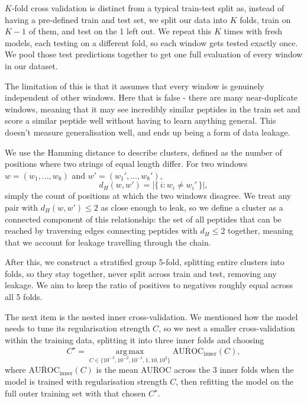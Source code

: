 \documentclass[10pt,a4paper]{article}
\numberwithin{equation}{section}
\begin{document}
$K$-fold cross validation is distinct from a typical train-test split as, instead of having a pre-defined train and test set, we split our data into $K$ folds, train on $K-1$ of them, and test on the 1 left out. We repeat this $K$ times with fresh models, each testing on a different fold, so each window gets tested exactly once. We pool those test predictions together to get one full evaluation of every window in our dataset.

The limitation of this is that it assumes that every window is genuinely independent of other windows. Here that is false - there are many near-duplicate windows, meaning that it may see incredibly similar peptides in the train set and score a similar peptide well without having to learn anything general. This doesn't measure generalisation well, and ends up being a form of data leakage.

We use the Hamming distance to describe clusters, defined as the number of positions where two strings of equal length differ. For two windows $w=(w_1,\dots,w_8)$ and $w'=(w_1',\dots,w_8')$,
\begin{equation}
d_H(w,w') = \bigl|\{\, i : w_i \neq w_i' \,\}\bigr|,
\label{eq:hamming}
\end{equation}
simply the count of positions at which the two windows disagree. We treat any pair with $d_H(w,w') \leq 2$ as close enough to leak, so we define a cluster as a connected component of this relationship: the set of all peptides that can be reached by traversing edges connecting peptides with $d_H \leq 2$ together, meaning that we account for leakage travelling through the chain.

After this, we construct a stratified group 5-fold, splitting entire clusters into folds, so they stay together, never split across train and test, removing any leakage. We aim to keep the ratio of positives to negatives roughly equal across all 5 folds.

The next item is the nested inner cross-validation. We mentioned how the model needs to tune its regularisation strength $C$, so we nest a smaller cross-validation within the training data, splitting it into three inner folds and choosing
\begin{equation}
C^\star = \operatorname*{arg\,max}_{C \in \{10^{-3},10^{-2},10^{-1},1,10,10^{2}\}} \overline{\mathrm{AUROC}}_{\mathrm{inner}}(C),
\label{eq:cstar}
\end{equation}
where $\overline{\mathrm{AUROC}}_{\mathrm{inner}}(C)$ is the mean AUROC across the 3 inner folds when the model is trained with regularisation strength $C$, then refitting the model on the full outer training set with that chosen $C^\star$.
\end{document}
